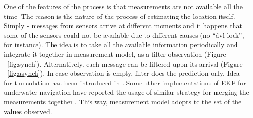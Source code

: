 One of the features of the process is that measurements are not available all the time. The reason is the nature of the process of estimating the location itself. Simply - messages from sensors arrive at different moments and it happens that some of the sensors could not be available due to different causes (no ``dvl lock'', for instance). The idea is to take all the available information periodically and integrate it together in measurement model, as a filter observation (Figure ~\ref{fig:synch}). Alternatively, each message can be filtered upon its arrival (Figure ~\ref{fig:asynch}). In case observation is empty, filter does the prediction only. Idea for the solution has been introduced in \cite{ribas10}. Some other implementations of EKF for underwater navigation have reported the usage of similar strategy for merging the measurements together \cite{drolet00, blain03}. This way, measurement model adopts to the set of the values observed.

